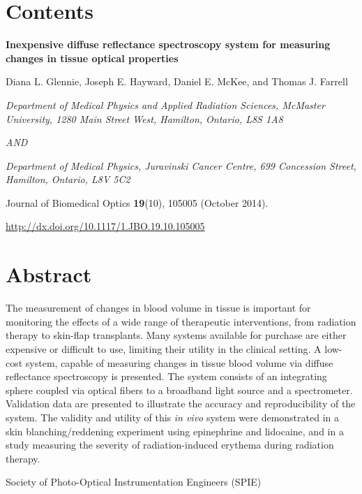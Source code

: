 \section*{Contents}

\begin{center}

\textbf{Inexpensive diffuse reflectance spectroscopy system for measuring changes in tissue optical properties}

Diana L. Glennie, Joseph E. Hayward, Daniel E. McKee, and Thomas J. Farrell

\textit{Department of Medical Physics and Applied Radiation Sciences, McMaster University, 1280 Main Street West, Hamilton, Ontario, L8S 1A8}

\textit{AND}

\textit{Department of Medical Physics, Juravinski Cancer Centre, 699 Concession Street, Hamilton, Ontario, L8V 5C2}

\end{center}

\noindent Journal of Biomedical Optics \textbf{19}(10), 105005 (October 2014).

\noindent \url{http://dx.doi.org/10.1117/1.JBO.19.10.105005}

\section*{Abstract}
The measurement of changes in blood volume in tissue is important for monitoring the effects of a wide range of therapeutic interventions, from radiation therapy to skin-flap transplants. Many systems available for purchase are either expensive or difficult to use, limiting their utility in the clinical setting. A low-cost system, capable of measuring changes in tissue blood volume via diffuse reflectance spectroscopy is presented. The system consists of an integrating sphere coupled via optical fibers to a broadband light source and a spectrometer. Validation data are presented to illustrate the accuracy and reproducibility of the system. The validity and utility of this \emph{in vivo} system were demonstrated in a skin blanching/reddening experiment using epinephrine and lidocaine, and in a study measuring the severity of radiation-induced erythema during radiation therapy.

\noindent {} Society of Photo-Optical Instrumentation Engineers (SPIE)


